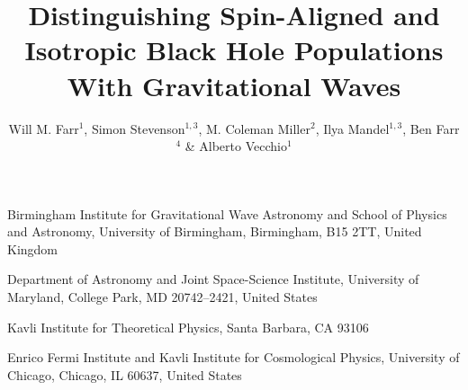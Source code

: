 \documentclass{nature-arxiv}
\begin{document}

\title{Distinguishing Spin-Aligned and Isotropic Black Hole
  Populations With Gravitational Waves}

\author{Will M. Farr$^1$, Simon Stevenson$^{1,3}$, M. Coleman Miller$^2$,
  Ilya Mandel$^{1,3}$, Ben Farr$^4$ \& Alberto Vecchio$^1$}

\maketitle

\begin{affiliations}
\item Birmingham Institute for Gravitational Wave Astronomy and
  School of Physics and Astronomy, University of Birmingham,
  Birmingham, B15 2TT, United Kingdom
\item Department of Astronomy and Joint Space-Science
  Institute, University of Maryland, College Park, MD 20742--2421,
  United States
\item Kavli Institute for Theoretical Physics, Santa Barbara, CA 93106
\item Enrico Fermi Institute and Kavli Institute for Cosmological
  Physics, University of Chicago, Chicago, IL 60637, United States
\end{affiliations}
\end{document}
